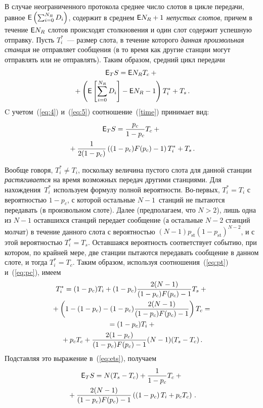 \begin{multicols}{2}
В случае неограниченного протокола среднее число слотов в цикле
передачи, равное  ${\sf E} \left (\sum_{i=0}^{N_R}D_i\right)$, содержит в
среднем ${\sf E} N_R+1$ {\it непустых  слотов}, причем в течение   ${\sf E}
N_R$ слотов происходят столкновения  и  один слот содержит успешную
отправку.  Пусть $T^*_{i}$~--- размер  слота, в течение которого {\it
данная произвольная станция}  не отправляет сообщения 
(в то время как   другие станции могут отправлять  или  не отправлять).
 Таким образом, средний цикл передачи 
\begin{multline}
   {\sf E}_T S   = {\sf E} N_R T_{c} + {}\\
   {}+\left ({\sf E} \left[\sum_{i=0}^{N_R}D_i\right]-{\sf E} N_R-1\right)T^*_{i}+
   T_{s}\,.
   \label{time}
\end{multline}
C учетом~(\ref{eq:4}) и~(\ref{eq:5}) соотношение~(\ref{time})
принимает вид:
\begin{multline}
   {\sf E}_T S   = \displaystyle\frac{\displaystyle p_c\mathstrut}{\displaystyle 1-p_c\mathstrut} T_{c} + {}\\
   {}+\displaystyle\frac{\displaystyle 1\mathstrut}{\displaystyle 2(1-p_c)\mathstrut}\left((1-p_c)F(p_c)-1\right)T^*_{i}+ T_{s}\,. 
   \label{eq:ets}
\end{multline}

Вообще говоря, $T^*_{i}\not = T_{i}$, поскольку
 величина  пустого слота для
данной станции {\it растягивается} на время возможных передач
другими станциями. Для нахождения~$T^*_{i}$ используем  формулу
полной вероятности. Во-первых, $T^*_{i}=T_{i}$ с вероятностью
$1-p_c$, с которой  остальные  $N-1$~станций  не пытаются передавать
(в произвольном слоте). Далее (предполагаем, что $N>2$), лишь одна из
$N-1$ оставшихся станций передает сообщение (а остальные $N-2$
станций молчат) в течение данного  слота с вероятностью
$(N-1)p_{\mathrm{st}}(1-p_{\mathrm{st}})^{N-2}$, и с этой вероятностью
$T^*_{i}=T_{s}$. Оставшаяся вероятность  соответствует событию, при
котором, по крайней мере, две станции пытаются передавать сообщение в
данном слоте, и тогда $T^*_{i}=T_{c}$. Таким образом, используя
соотношения~(\ref{eq:pt}) и~(\ref{eq:pc}), имеем
\begin{multline*}
    T^*_{i} = (1-p_c)T_{i}+
   (1-p_c)\displaystyle\frac{\displaystyle 2(N-1)\mathstrut}{\displaystyle (1-p_c)F(p_c)-1\mathstrut}T_{s}+{}\\
{}+\left(1-(1-p_c)-
   (1-p_c)\displaystyle\frac{\displaystyle 2(N-1)\mathstrut}{\displaystyle (1-p_c)F(p_c)-1\mathstrut}\right)T_{c}={}\\
{}= (1-p_c)T_{i} +{}\\
{}+ p_c T_{c} + \displaystyle\frac{\displaystyle 2(1-p_c)\mathstrut}{\displaystyle (1-p_c)F(p_c)-1\mathstrut}(N-1)(T_{s}-T_{c})\,.
\end{multline*}
Подставляя это выражение  в~(\ref{eq:ets}), получаем
    \begin{multline*}
   {\sf E}_T S   = N(T_{s}-T_{c}) +\displaystyle\frac{\displaystyle 1\mathstrut}{\displaystyle 1-p_c\mathstrut}T_{c} +{}\\
   {}+
   \displaystyle\frac{\displaystyle 2(N-1)\mathstrut}{\displaystyle (1-p_c)F(p_c)-1\mathstrut}\left(\left(1-p_c\right)T_{i} + p_c
   T_{c}\right)\,.
   \end{multline*}


\end{multicols}
